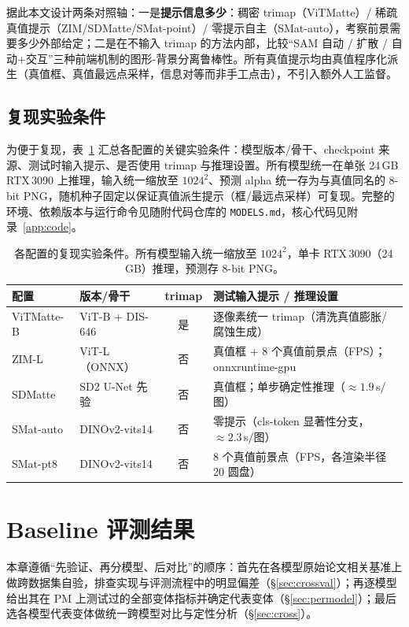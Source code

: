 \documentclass[supercite]{HustGraduPaper}
\begin{document}
	据此本文设计两条对照轴：一是\textbf{提示信息多少}：稠密 trimap（ViTMatte）/ 稀疏真值提示（ZIM/SDMatte/SMat-point）/ 零提示自主（SMat-auto），考察前景需要多少外部给定；二是在不输入 trimap 的方法内部，比较“SAM 自动 / 扩散 / 自动+交互”三种前端机制的图形-背景分离鲁棒性。所有真值提示均由真值程序化派生（真值框、真值最远点采样，信息对等而非手工点击），不引入额外人工监督。

	\subsection{复现实验条件}\label{sec:repro}
	为便于复现，表~\ref{tab:repro} 汇总各配置的关键实验条件：模型版本/骨干、checkpoint 来源、测试时输入提示、是否使用 trimap 与推理设置。所有模型统一在单张 24\,GB RTX\,3090 上推理，输入统一缩放至 $1024^2$、预测 alpha 统一存为与真值同名的 8-bit PNG，随机种子固定以保证真值派生提示（框/最远点采样）可复现。完整的环境、依赖版本与运行命令见随附代码仓库的 \texttt{MODELS.md}，核心代码见附录~\ref{app:code}。

	\begin{table}[ht]
		\centering
		\caption{各配置的复现实验条件。所有模型输入统一缩放至 $1024^2$，单卡 RTX\,3090（24\,GB）推理，预测存 8-bit PNG。}
		\label{tab:repro}
		\small
		\begin{tabularx}{\linewidth}{@{}l l c X@{}}
			\toprule
			配置 & 版本/骨干 & trimap & 测试输入提示 / 推理设置 \\
			\midrule
			ViTMatte-B  & ViT-B + DIS-646   & 是 & 逐像素统一 trimap（清洗真值膨胀/腐蚀生成） \\
			ZIM-L       & ViT-L（ONNX）        & 否 & 真值框 + 8 个真值前景点（FPS）；onnxruntime-gpu \\
			SDMatte     & SD2 U-Net 先验       & 否 & 真值框；单步确定性推理（$\approx1.9$\,s/图） \\
			SMat-auto   & DINOv2-vits14        & 否 & 零提示（cls-token 显著性分支，$\approx2.3$\,s/图） \\
			SMat-pt8    & DINOv2-vits14        & 否 & 8 个真值前景点（FPS，各渲染半径 20 圆盘） \\
			\bottomrule
		\end{tabularx}
	\end{table}

	\section{Baseline 评测结果}
	本章遵循“先验证、再分模型、后对比”的顺序：首先在各模型原始论文相关基准上做跨数据集自验，排查实现与评测流程中的明显偏差（\S\ref{sec:crossval}）；再逐模型给出其在 PM 上测试过的全部变体指标并确定代表变体（\S\ref{sec:permodel}）；最后选各模型代表变体做统一跨模型对比与定性分析（\S\ref{sec:cross}）。
\end{document}
